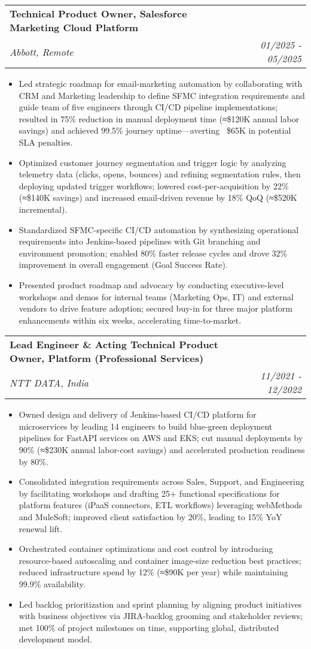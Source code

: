 \documentclass[letterpaper,11pt]{article}
\makeatletter
\newcommand{\resumeItem}[1]{
  \item\small{
    {#1 \vspace{-1pt}}
  }
}
\newcommand{\resumeSubheading}[4]{
  \vspace{-2pt}\item
    \begin{tabular*}{1.0\textwidth}[t]{l@{\extracolsep{\fill}}r}
      \textbf{\large#1} & \textbf{\small #2} \\
      \textit{\large#3} & \textit{\small #4} \\
      
    \end{tabular*}\vspace{-7pt}
}
\newcommand{\resumeItemListStart}{\begin{itemize}[leftmargin=0.1in]}
\newcommand{\resumeItemListEnd}{\end{itemize}\vspace{-5pt}}
\makeatother
\begin{document}
    \resumeSubheading
      {Technical Product Owner, Salesforce Marketing Cloud Platform}{} 
      {Abbott, Remote}{01/2025 - 05/2025}
      \resumeItemListStart
            \resumeItem{\normalsize{Led strategic roadmap for email-marketing automation by collaborating with CRM and Marketing leadership to define SFMC integration requirements and guide team of five engineers through CI/CD pipeline implementations; resulted in 75\% reduction in manual deployment time (≈\$120K annual labor savings) and achieved 99.5\% journey uptime—averting ~\$65K in potential SLA penalties.}}
            \resumeItem{\normalsize{Optimized customer journey segmentation and trigger logic by analyzing telemetry data (clicks, opens, bounces) and refining segmentation rules, then deploying updated trigger workflows; lowered cost-per-acquisition by 22\% (≈\$140K savings) and increased email-driven revenue by 18\% QoQ (≈\$520K incremental).}}  
            \resumeItem{\normalsize{Standardized SFMC-specific CI/CD automation by synthesizing operational requirements into Jenkins-based pipelines with Git branching and environment promotion; enabled 80\% faster release cycles and drove 32\% improvement in overall engagement (Goal Success Rate).}}
            \resumeItem{\normalsize{Presented product roadmap and advocacy by conducting executive-level workshops and demos for internal teams (Marketing Ops, IT) and external vendors to drive feature adoption; secured buy-in for three major platform enhancements within six weeks, accelerating time-to-market.}}  
      \resumeItemListEnd  

    \resumeSubheading
      {Lead Engineer \& Acting Technical Product Owner, Platform (Professional Services)}{} 
      {NTT DATA, India}{11/2021 - 12/2022}
      \resumeItemListStart
            \resumeItem{\normalsize{Owned design and delivery of Jenkins-based CI/CD platform for microservices by leading 14 engineers to build blue-green deployment pipelines for FastAPI services on AWS and EKS; cut manual deployments by 90\% (≈\$230K annual labor-cost savings) and accelerated production readiness by 80\%.}}
            \resumeItem{\normalsize{Consolidated integration requirements across Sales, Support, and Engineering by facilitating workshops and drafting 25+ functional specifications for platform features (iPaaS connectors, ETL workflows) leveraging webMethods and MuleSoft; improved client satisfaction by 20\%, leading to 15\% YoY renewal lift.}}  
            \resumeItem{\normalsize{Orchestrated container optimizations and cost control by introducing resource-based autoscaling and container image-size reduction best practices; reduced infrastructure spend by 12\% (≈\$90K per year) while maintaining 99.9\% availability.}}
            \resumeItem{\normalsize{Led backlog prioritization and sprint planning by aligning product initiatives with business objectives via JIRA-backlog grooming and stakeholder reviews; met 100\% of project milestones on time, supporting global, distributed development model.}}  
      \resumeItemListEnd  
\end{document}
